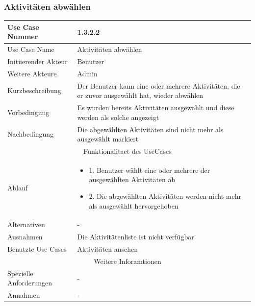 \documentclass[10pt,a4paper]{article}
\begin{document}
	\subsubsection{Aktivit\"aten abw\"ahlen}
	\begin{tabular}{|l|p{.5\linewidth}|}
	\hline Use Case Nummer & 1.3.2.2 \\ 
	\hline Use Case Name & Aktivit\"aten abw\"ahlen \\ 
	\hline Initiierender Akteur & Benutzer \\
	\hline Weitere Akteure & Admin \\
	\hline Kurzbeschreibung & Der Benutzer kann eine oder mehrere Aktivit\"aten, die er zuvor ausgew\"ahlt hat, wieder abw\"ahlen \\
	\hline Vorbedingung & Es wurden bereits Aktivit\"aten ausgew\"ahlt und diese werden als solche angezeigt \\
	\hline Nachbedingung & Die abgew\"ahlten Aktivit\"aten sind nicht mehr als ausgew\"ahlt markiert \\
	\hline \multicolumn{2}{|c|}{Funktionalitaet des UseCases}\\
	\hline Ablauf & \begin{itemize}
			\item 1. Benutzer w\"ahlt eine oder mehrere der ausgew\"ahlten Aktivit\"aten ab
			\item 2. Die abgew\"ahlten Aktivit\"aten werden nicht mehr als ausgew\"ahlt hervorgehoben
		\end{itemize} \\
	\hline Alternativen & - \\
	\hline Ausnahmen & Die Aktivit\"atenliste ist nicht verf\"ugbar \\
	\hline Benutzte Use Cases & Aktivit\"aten ansehen \\
	\hline \multicolumn{2}{|c|}{Weitere Inforamtionen} \\
	\hline Spezielle Anforderungen & - \\
	\hline Annahmen & - \\
	\hline
	\end{tabular} 
\end{document}
